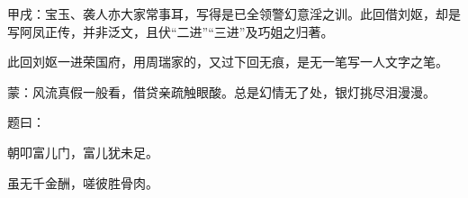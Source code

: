 \begin{parag}
    \begin{note}甲戌：宝玉、袭人亦大家常事耳，写得是已全领警幻意淫之训。此回借刘妪，却是写阿凤正传，并非泛文，且伏“二进”“三进”及巧姐之归著。\end{note}
\end{parag}


\begin{parag}
    \begin{note}此回刘妪一进荣国府，用周瑞家的，又过下回无痕，是无一笔写一人文字之笔。\end{note}
\end{parag}


\begin{parag}
    \begin{note}蒙：风流真假一般看，借贷亲疏触眼酸。总是幻情无了处，银灯挑尽泪漫漫。\end{note}
\end{parag}


\begin{parag}
    题曰：
\end{parag}

\begin{poem}
    \begin{pl}朝叩富儿门，富儿犹未足。\end{pl}

    \begin{pl}虽无千金酬，嗟彼胜骨肉。\end{pl}
\end{poem}


